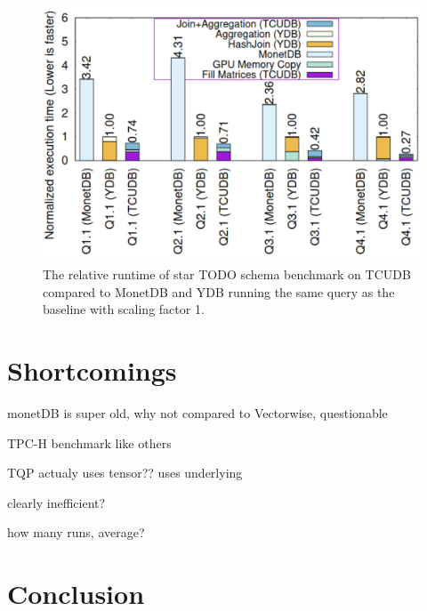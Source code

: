 \documentclass{paper}
\begin{document}
	
	\begin{figure}
		\centering
		\includegraphics[width=0.9\linewidth]{bench4}
		\caption{The relative runtime of star  TODO schema benchmark on TCUDB compared to MonetDB and YDB running the same query as the baseline with scaling factor 1.}
		\label{fig:bench4}
	\end{figure}
	
	
	\section{Shortcomings}
	
	monetDB is super old, why not compared to Vectorwise, questionable 
	
	TPC-H benchmark like others
	
	TQP actualy uses tensor?? uses underlying
	
	clearly inefficient? 
	
	how many runs, average?
	
	
	\section{Conclusion}
	


	
\end{document}
